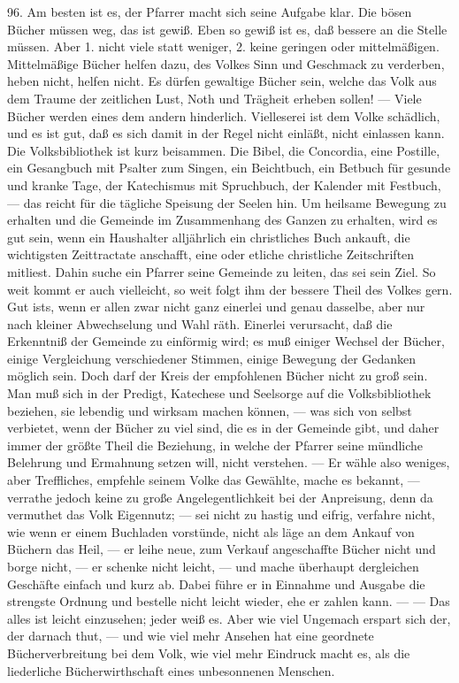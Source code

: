 96. Am besten ist es, der Pfarrer macht sich seine Aufgabe klar. Die bösen Bücher müssen weg, das ist gewiß. Eben so gewiß ist es, daß bessere an die Stelle müssen. Aber 1. nicht viele statt weniger, 2. keine geringen oder mittelmäßigen. Mittelmäßige Bücher helfen dazu, des Volkes Sinn und Geschmack zu verderben, heben nicht, helfen nicht. Es dürfen gewaltige Bücher sein, welche das Volk aus dem Traume der zeitlichen Lust, Noth und Trägheit erheben sollen! — Viele Bücher werden eines dem andern hinderlich. Vielleserei ist dem
Volke schädlich, und es ist gut, daß es sich damit in der Regel nicht einläßt, nicht einlassen kann. Die Volksbibliothek ist kurz beisammen. Die Bibel, die Concordia, eine Postille, ein Gesangbuch mit Psalter zum Singen, ein Beichtbuch, ein Betbuch für gesunde und kranke Tage, der Katechismus mit Spruchbuch, der Kalender mit Festbuch, — das reicht für die tägliche Speisung der Seelen hin. Um heilsame Bewegung zu erhalten und die Gemeinde im Zusammenhang des Ganzen zu erhalten, wird es gut sein, wenn ein Haushalter alljährlich ein christliches Buch ankauft, die wichtigsten Zeittractate anschafft, eine oder etliche christliche Zeitschriften mitliest. Dahin suche ein Pfarrer seine Gemeinde zu leiten, das sei sein Ziel. So weit kommt er auch vielleicht, so weit folgt ihm der bessere Theil des Volkes gern. Gut ists, wenn er allen zwar nicht ganz einerlei und genau dasselbe, aber nur nach kleiner Abwechselung und Wahl räth. Einerlei verursacht, daß die Erkenntniß der Gemeinde zu einförmig wird; es muß einiger Wechsel der Bücher, einige Vergleichung verschiedener Stimmen, einige Bewegung der Gedanken möglich sein. Doch darf der Kreis der empfohlenen Bücher nicht zu groß sein. Man muß sich in der Predigt, Katechese und Seelsorge auf die Volksbibliothek beziehen, sie lebendig und wirksam machen können, — was sich von selbst verbietet, wenn der Bücher zu viel sind, die es in der Gemeinde gibt, und daher immer der größte Theil die Beziehung, in welche der Pfarrer seine mündliche Belehrung und Ermahnung setzen will, nicht verstehen. — Er wähle also weniges, aber Treffliches, empfehle seinem
Volke das Gewählte, mache es bekannt, — verrathe jedoch keine zu große Angelegentlichkeit bei der Anpreisung, denn da vermuthet das Volk Eigennutz; — sei nicht zu hastig und eifrig, verfahre nicht, wie wenn er einem Buchladen vorstünde, nicht als läge an dem Ankauf von Büchern das Heil, — er leihe neue, zum Verkauf angeschaffte Bücher nicht und borge nicht, — er schenke nicht leicht, — und mache überhaupt dergleichen Geschäfte einfach und kurz ab. Dabei führe er in Einnahme und Ausgabe die strengste Ordnung und bestelle nicht leicht wieder, ehe er zahlen kann. — — Das alles ist leicht einzusehen; jeder weiß es. Aber wie viel Ungemach erspart sich der, der darnach thut, — und wie viel mehr Ansehen hat eine geordnete Bücherverbreitung bei dem Volk, wie viel mehr Eindruck macht es, als die liederliche Bücherwirthschaft eines unbesonnenen Menschen.

